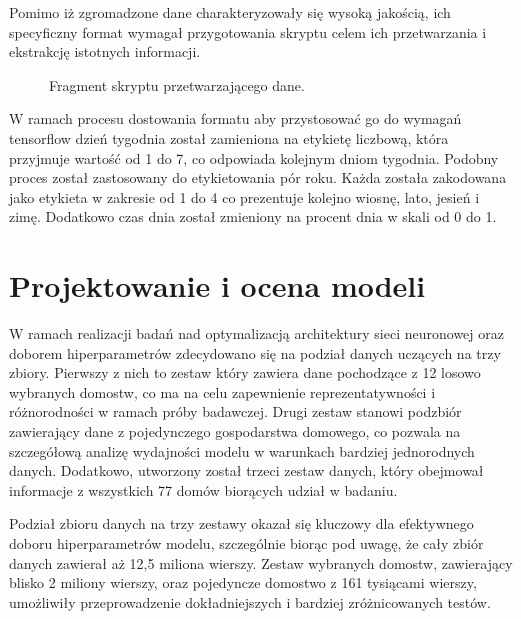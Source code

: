 \documentclass[a4paper,twoside,12pt]{book}
\begin{document}
\newpage
Pomimo iż zgromadzone dane charakteryzowały się wysoką jakością, ich specyficzny format wymagał przygotowania skryptu celem ich przetwarzania i ekstrakcję istotnych informacji.\\
\begin{figure}[!h]
  \centering
  
  \caption{Fragment skryptu przetwarzającego dane.}
  \label{fig:pseudokod:listings}
\end{figure}

W ramach procesu dostowania formatu aby przystosować go do wymagań tensorflow dzień tygodnia został zamieniona na etykietę liczbową, która przyjmuje wartość od 1 do 7, co odpowiada kolejnym dniom tygodnia. Podobny proces został zastosowany do etykietowania pór roku. Każda została zakodowana jako etykieta w zakresie od 1 do 4 co prezentuje kolejno wiosnę, lato, jesień i zimę. Dodatkowo czas dnia został zmieniony na procent dnia w skali od 0 do 1.
\section{Projektowanie i ocena modeli}
W ramach realizacji badań nad optymalizacją architektury sieci neuronowej oraz doborem hiperparametrów zdecydowano się na podział danych uczących na trzy zbiory. Pierwszy z nich to zestaw który zawiera dane pochodzące z 12 losowo wybranych domostw, co ma na celu zapewnienie reprezentatywności i różnorodności w ramach próby badawczej. Drugi zestaw stanowi podzbiór zawierający dane z pojedynczego gospodarstwa domowego, co pozwala na szczegółową analizę wydajności modelu w warunkach bardziej jednorodnych danych. Dodatkowo, utworzony został trzeci zestaw danych, który obejmował informacje z wszystkich 77 domów biorących udział w badaniu.


Podział zbioru danych na trzy zestawy okazał się kluczowy dla efektywnego doboru hiperparametrów modelu, szczególnie biorąc pod uwagę, że cały zbiór danych zawierał aż 12,5 miliona wierszy. Zestaw wybranych domostw, zawierający blisko 2 miliony wierszy, oraz pojedyncze domostwo z 161 tysiącami wierszy, umożliwiły przeprowadzenie dokładniejszych i bardziej zróżnicowanych testów.
\end{document}
